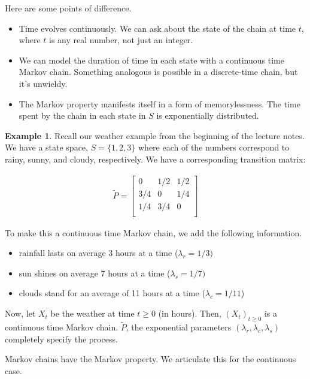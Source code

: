 \documentclass[12pt]{article}
\theoremstyle{definition}
\newtheorem{example}{Example}[section]
\begin{document}
Here are some points of difference.

\begin{itemize}
  \item Time evolves continuously. We can ask about the state of the chain at time $t$, where $t$ is any real number, not just an integer.
  \item We can model the duration of time in each state with a continuous time Markov chain. Something analogous is possible in a discrete-time chain, but it's unwieldy.
  \item The Markov property manifests itself in a form of memorylessness. The time spent by the chain in each state in $S$ is exponentially distributed.
\end{itemize}

\begin{example}
  Recall our weather example from the beginning of the lecture notes. We have a state space, $S = \{ 1, 2, 3\}$ where each of the numbers correspond to rainy, sunny, and cloudy, respectively. We have a corresponding transition matrix:

  \begin{align*}
    \widetilde{P} =
    \begin{bmatrix}
      0 & 1/2 & 1/2 \\
      3/4 & 0 & 1/4 \\
      1/4 & 3/4 & 0 \\
    \end{bmatrix}
  \end{align*}

  To make this a continuous time Markov chain, we add the following information.

  \begin{itemize}
    \item rainfall lasts on average 3 hours at a time ($\lambda_r = 1/3)$
    \item sun shines on average 7 hours at a time ($\lambda_s = 1/7)$
    \item clouds stand for an average of 11 hours at a time ($\lambda_c = 1/11$)
  \end{itemize}

  Now, let $X_t$ be the weather at time $t \geq 0$ (in hours). Then, $(X_t)_{t \geq 0}$ is a continuous time Markov chain. $\widetilde{P}$, the exponential parameters $(\lambda_r, \lambda_c, \lambda_s)$ completely specify the process.
\end{example}

Markov chains have the Markov property. We articulate this for the continuous case.
\end{document}
